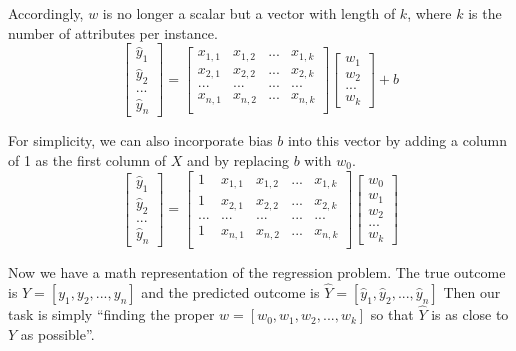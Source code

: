 \documentclass[
	letterpaper
]{article}
\begin{document}
Accordingly, $w$ is no longer a scalar but a vector with length of $k$, where $k$ is the number of attributes per instance.
\begin{equation}
\begin{bmatrix}\hat y_1 \\ \hat y_2 \\ ... \\ \hat y_n\end{bmatrix}
 = \begin{bmatrix}
x_{1, 1} & x_{1, 2} & ... & x_{1, k} \\
x_{2, 1} & x_{2, 2} & ... & x_{2, k} \\
... & ... & ... & ... \\
x_{n, 1} & x_{n, 2} & ... & x_{n, k} \\
\end{bmatrix}
\begin{bmatrix} w_1 \\  w_2 \\ ... \\ w_k\end{bmatrix}
+b
\end{equation}

For simplicity, we can also incorporate bias $b$ into this vector by adding a column of 1 as the first column of $X$ and by replacing $b$ with $w_0$.
\begin{equation}
\begin{bmatrix}\hat y_1 \\ \hat y_2 \\ ... \\ \hat y_n\end{bmatrix}
 = \begin{bmatrix}
1 & x_{1, 1} & x_{1, 2} & ... & x_{1, k} \\
1 & x_{2, 1} & x_{2, 2} & ... & x_{2, k} \\
... & ... & ... & ... & ... \\
1 & x_{n, 1} & x_{n, 2} & ... & x_{n, k} \\
\end{bmatrix}
\begin{bmatrix} w_0 \\ w_1 \\  w_2 \\ ... \\ w_k\end{bmatrix}
\end{equation}

Now we have a math representation of the regression problem.
The true outcome is $Y = [y_1, y_2, ..., y_n]$ and the predicted outcome is $\hat Y = [ \hat y_1, \hat y_2, ..., \hat y_n]$
Then our task is simply ``finding the proper $w = [w_0, w_1, w_2, ..., w_k]$ so that $\hat Y$ is as close to $Y$ as possible''.
\end{document}

